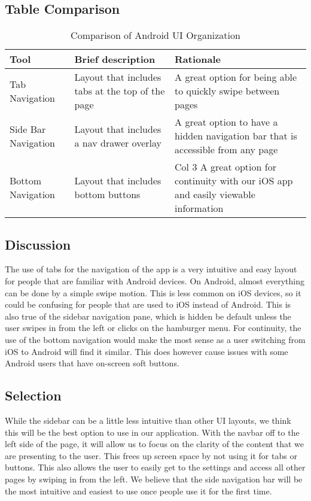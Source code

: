 \documentclass[letterpaper,10pt,draftclsnofoot,onecolumn,titlepage]{IEEEtran}
\begin{document}
		\subsection{Table Comparison}
			\begin{table}[ht]
			\caption{Comparison of Android UI Organization}
				\begin{center}
				\begin{tabular} { | m{3cm} | m{5cm} | m{5cm} | }
					\hline\hline
					Tool & Brief description & Rationale \\ [0.5ex]
					\hline
					Tab Navigation & Layout that includes tabs at the top of the page & A great option for being able to quickly swipe between pages \\
					\hline
					Side Bar Navigation & Layout that includes a nav drawer overlay & A great option to have a hidden navigation bar that is accessible from any page \\
					\hline
					Bottom Navigation & Layout that includes bottom buttons & Col 3 A great option for continuity with our iOS app and easily viewable information\\
					\hline
				\end{tabular}
				\end{center}
			\end{table}

		\subsection{Discussion}
			The use of tabs for the navigation of the app is a very intuitive and easy layout for people that are familiar with Android devices.
			On Android, almost everything can be done by a simple swipe motion.
			This is less common on iOS devices, so it could be confusing for people that are used to iOS instead of Android.
			This is also true of the sidebar navigation pane, which is hidden be default unless the user swipes in from the left or clicks on the hamburger menu.
			For continuity, the use of the bottom navigation would make the most sense as a user switching from iOS to Android will find it similar.
			This does however cause issues with some Android users that have on-screen soft buttons.

		\subsection{Selection}
			While the sidebar can be a little less intuitive than other UI layouts, we think this will be the best option to use in our application.
			With the navbar off to the left side of the page, it will allow us to focus on the clarity of the content that we are presenting to the user.
			This frees up screen space by not using it for tabs or buttons.
			This also allows the user to easily get to the settings and access all other pages by swiping in from the left.
			We believe that the side navigation bar will be the most intuitive and easiest to use once people use it for the first time.
\end{document}
